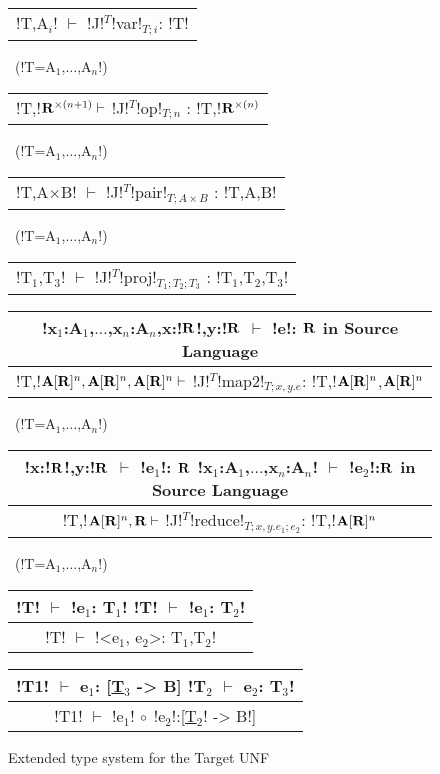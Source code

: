\begin{figure*}[tb]
    \centering
    \begin{tabular}{c} 
        \\\hline
        !T,A$_i$! $\vdash$ !J!$^T$!var!$_{T;i}$: !T!
        \end{tabular}~(!T=A$_1$,$\ldots$,A$_n$!)
        \hspace{0.5cm}
        \begin{tabular}{c}
            \\\hline
            !T,!$\mathbf{R}^{\times(n+1)} \vdash$ !J!$^T$!op!$_{T;n}$ : !T,!$\mathbf{R}^{\times(n)}$
        \end{tabular}~(!T=A$_1$,$\ldots$,A$_n$!)
    
        \begin{tabular}{c}
            \\\hline
            !T,A$\times$B! $\vdash$ !J!$^T$!pair!$_{T;A\times B}$ : !T,A,B!
        \end{tabular}~(!T=A$_1$,$\ldots$,A$_n$!)
    
        \begin{tabular}{c}
            \\\hline
            !T$_1$,T$_3$! $\vdash$ !J!$^T$!proj!$_{T_1;T_2;T_3}$ : !T$_1$,T$_2$,T$_3$!
        \end{tabular}
    
        \begin{tabular}{c}
            !x$_1$:A$_1$,$\ldots$,x$_n$:A$_n$,x:!$\mathbf{R}$!,y:!$\mathbf{R}$ $\vdash$ !e!: $\mathbf{R}$ \quad in Source Language
            \\\hline  
            !T,!$\mathbf{A}[\mathbf{R}]^{n},\mathbf{A}[\mathbf{R}]^{n},\mathbf{A}[\mathbf{R}]^{n} \vdash$ !J!$^T$!map2!$_{T; x,y.e}$: !T,!$\mathbf{A}[\mathbf{R}]^{n}$,$\mathbf{A}[\mathbf{R}]^{n}$
        \end{tabular}~(!T=A$_1$,$\ldots$,A$_n$!)
    
        \begin{tabular}{c}
            !x:!$\mathbf{R}$!,y:!$\mathbf{R}$ $\vdash$ !e$_1$!: $\mathbf{R}$ \quad !x$_1$:A$_1$,$\ldots$,x$_n$:A$_n$! $\vdash$ !e$_2$!:$\mathbf{R}$ \quad in Source Language
            \\\hline  
            !T,!$\mathbf{A}[\mathbf{R}]^{n},\mathbf{R} \vdash$ !J!$^T$!reduce!$_{T; x,y.e_1; e_2}$: !T,!$\mathbf{A}[\mathbf{R}]^{n}$
        \end{tabular}~(!T=A$_1$,$\ldots$,A$_n$!)

        \begin{tabular}{c}
            !T! $\vdash$ !e$_1$: T$_1$!  \quad !T! $\vdash$ !e$_1$: T$_2$!
            \\ \hline
            !T! $\vdash$ !<e$_1$, e$_2$>: T$_1$,T$_2$!
        \end{tabular}
        \hspace{0.5cm}
        \begin{tabular}{c}
            !T1! $\vdash$ e$_1$: [\underline{T$_3$} -> B]  \quad !T$_2$ $\vdash$ e$_2$: T$_3$! 
            \\ \hline
            !T1! $\vdash$ !e$_1$! $\circ$ !e$_2$!:[\underline{T$_2$}! -> B!]
        \end{tabular}

    \vspace{-0.2cm}
    \caption{Extended type system for the Target UNF}
    \vspace{-0.4cm}
    \label{fig:target_unf_typesystem}
    \end{figure*}